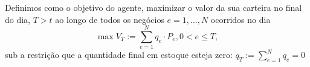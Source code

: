 Definimos como o objetivo do agente, maximizar o valor da sua carteira no final do dia, $T>t$ ao longo de todos os negócios $e=1,...,N$ ocorridos no dia
\begin{equation*}
    \max V_T := \sum_{e=1}^N q_e \cdot P_e, 0<e\leq T, 
\end{equation*}
sub a restrição que a quantidade final em estoque esteja zero: $q_T:= \sum_{e=1}^N q_e = 0$
